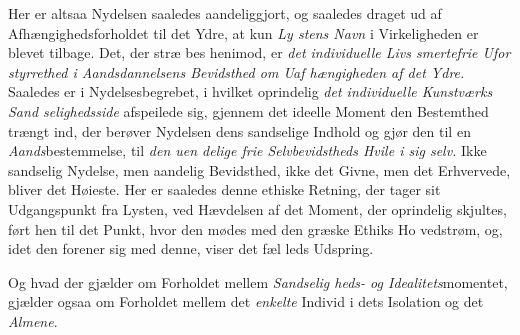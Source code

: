 Her er altsaa Nydelsen saaledes aandeliggjort, og saaledes
draget ud af Afhængighedsforholdet til det Ydre, at kun \emph{Ly\-%
stens Navn} i Virkeligheden er blevet tilbage. Det, der stræ\-%
bes henimod, er \emph{det individuelle Livs smertefrie Ufor\-%
styrrethed i Aandsdannelsens Bevidsthed om Uaf\-%
hængigheden af det Ydre.} Saaledes er i Nydelsesbegrebet,
i hvilket oprindelig \emph{det individuelle Kunstværks Sand\-%
selighedsside} afspeilede sig, gjennem det ideelle Moment den
Bestemthed trængt ind, der berøver Nydelsen dens sandselige
Indhold og gjør den til en \emph{Aands}bestemmelse, til \emph{den uen\-%
delige frie Selvbevidstheds Hvile i sig selv.} Ikke
sandselig Nydelse, men aandelig Bevidsthed, ikke det Givne,
men det Erhvervede, bliver det Høieste. Her er saaledes denne
ethiske Retning, der tager sit Udgangspunkt fra Lysten, ved
Hævdelsen af det Moment, der oprindelig skjultes, ført hen til
det Punkt, hvor den mødes med den græske Ethiks Ho\-%
vedstrøm, og, idet den forener sig med denne, viser det fæl\-%
leds Udspring.

Og hvad der gjælder om Forholdet mellem \emph{Sandselig\-%
heds- og Idealitets}momentet, gjælder ogsaa om Forholdet
mellem det \emph{enkelte} Individ i dets Isolation og det \emph{Almene}.


